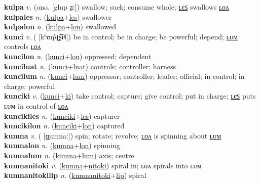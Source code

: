\textbf{kulpa} \textit{v.} (ono. [glup a̤ː])
swallow; suck; consume whole; \hyperref[kulpales]{ʟєꜱ} swallows \hyperref[kulpalon]{ʟᴏᴧ} \label{kulpa} \\
\textbf{kulpales} \textit{n.} (\hyperref[kulpa]{kulpa}+\hyperref[les]{les})
swallower \label{kulpales} \\
\textbf{kulpalon} \textit{n.} (\hyperref[kulpa]{kulpa}+\hyperref[lon]{lon})
swallowed \label{kulpalon} \\
\textbf{kunci} \textit{v.} ( [kʰʊŋ˥˩ʈ͡ʂɨ˥˩])
be in control; be in charge; be powerful; depend; \hyperref[kuncilum]{ʟᴜᴍ} controls \hyperref[kuncilon]{ʟᴏᴧ} \label{kunci} \\
\textbf{kuncilon} \textit{n.} (\hyperref[kunci]{kunci}+\hyperref[lon]{lon})
oppressed; dependent \label{kuncilon} \\
\textbf{kunciluat} \textit{n.} (\hyperref[kunci]{kunci}+\hyperref[luat]{luat})
controls; controller; harness \label{kunciluat} \\
\textbf{kuncilum} \textit{n.} (\hyperref[kunci]{kunci}+\hyperref[lum]{lum})
oppressor; controller; leader; official; in control; in charge; powerful \label{kuncilum} \\
\textbf{kunciki} \textit{v.} (\hyperref[kunci]{kunci}+\hyperref[ki]{ki})
take control; capture; give control; put in charge; \hyperref[kuncikiles]{ʟєꜱ} puts ʟᴜᴍ in control of \hyperref[kuncikilon]{ʟᴏᴧ} \label{kunciki} \\
\textbf{kuncikiles} \textit{n.} (\hyperref[kunciki]{kunciki}+\hyperref[les]{les})
capturer \label{kuncikiles} \\
\textbf{kuncikilon} \textit{n.} (\hyperref[kunciki]{kunciki}+\hyperref[lon]{lon})
captured \label{kuncikilon} \\
\textbf{kumna} \textit{v.} ( [ɡ̤umnaː])
spin; rotate; revolve; \hyperref[kumnalon]{ʟᴏᴧ} is spinning about \hyperref[kumnalum]{ʟᴜᴍ} \label{kumna} \\
\textbf{kumnalon} \textit{n.} (\hyperref[kumna]{kumna}+\hyperref[lon]{lon})
spinning \label{kumnalon} \\
\textbf{kumnalum} \textit{n.} (\hyperref[kumna]{kumna}+\hyperref[lum]{lum})
axis; centre \label{kumnalum} \\
\textbf{kumnanitoki} \textit{v.} (\hyperref[kumna]{kumna}+\hyperref[nitoki]{nitoki})
spiral in; ʟᴏᴧ spirals into ʟᴜᴍ \label{kumnanitoki} \\
\textbf{kumnanitokilip} \textit{n.} (\hyperref[kumnanitoki]{kumnanitoki}+\hyperref[lip]{lip})
spiral \label{kumnanitokilip} \\
